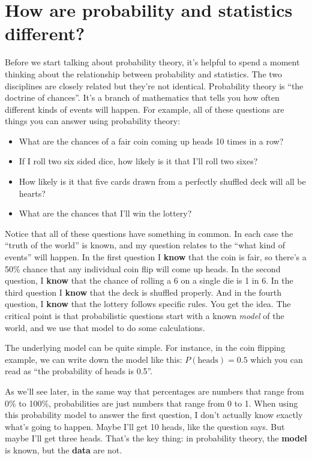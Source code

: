 \documentclass[
  letterpaper,
  DIV=11,
  numbers=noendperiod]{scrreprt}
\begin{document}
\section{How are probability and statistics
different?}\label{how-are-probability-and-statistics-different}

Before we start talking about probability theory, it's helpful to spend
a moment thinking about the relationship between probability and
statistics. The two disciplines are closely related but they're not
identical. Probability theory is ``the doctrine of chances''. It's a
branch of mathematics that tells you how often different kinds of events
will happen. For example, all of these questions are things you can
answer using probability theory:

\begin{itemize}
\item
  What are the chances of a fair coin coming up heads 10 times in a row?
\item
  If I roll two six sided dice, how likely is it that I'll roll two
  sixes?
\item
  How likely is it that five cards drawn from a perfectly shuffled deck
  will all be hearts?
\item
  What are the chances that I'll win the lottery?
\end{itemize}

Notice that all of these questions have something in common. In each
case the ``truth of the world'' is known, and my question relates to the
``what kind of events'' will happen. In the first question I
\textbf{know} that the coin is fair, so there's a 50\% chance that any
individual coin flip will come up heads. In the second question, I
\textbf{know} that the chance of rolling a 6 on a single die is 1 in 6.
In the third question I \textbf{know} that the deck is shuffled
properly. And in the fourth question, I \textbf{know} that the lottery
follows specific rules. You get the idea. The critical point is that
probabilistic questions start with a known \emph{model} of the world,
and we use that model to do some calculations.

The underlying model can be quite simple. For instance, in the coin
flipping example, we can write down the model like this:
\(P(\mbox{heads}) = 0.5\) which you can read as ``the probability of
heads is 0.5''.

As we'll see later, in the same way that percentages are numbers that
range from 0\% to 100\%, probabilities are just numbers that range from
0 to 1. When using this probability model to answer the first question,
I don't actually know exactly what's going to happen. Maybe I'll get 10
heads, like the question says. But maybe I'll get three heads. That's
the key thing: in probability theory, the \textbf{model} is known, but
the \textbf{data} are not.
\end{document}
